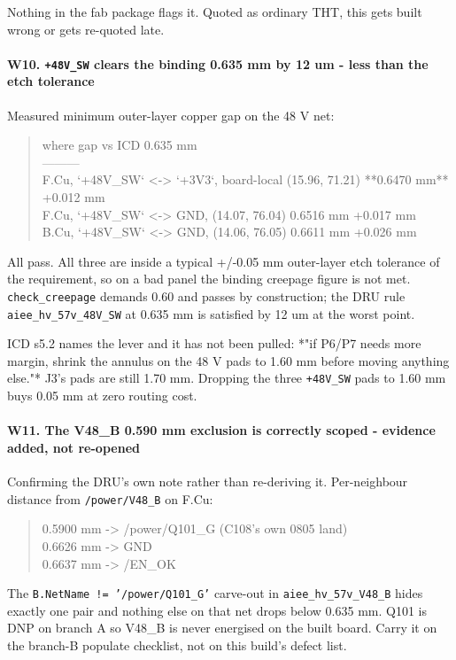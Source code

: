 \documentclass[11pt,a4paper]{article}
\begin{document}
Nothing in the fab package flags it. Quoted as ordinary THT, this gets built wrong or gets re-quoted late.

\paragraph*{W10. \texttt{+48V\_SW} clears the binding 0.635 mm by 12 um - less than the etch tolerance}
Measured minimum outer-layer copper gap on the 48 V net:

\begin{quote}\small\ttfamily\raggedright
\textbar{} where \textbar{} gap \textbar{} vs ICD 0.635 mm \textbar{}\\
\textbar{}---\textbar{}---\textbar{}---\textbar{}\\
\textbar{} F.Cu, `+48V\_SW` \textless{}-\textgreater{} `+3V3`, board-local (15.96, 71.21) \textbar{} {*}{*}0.6470 mm{*}{*} \textbar{} +0.012 mm \textbar{}\\
\textbar{} F.Cu, `+48V\_SW` \textless{}-\textgreater{} GND, (14.07, 76.04) \textbar{} 0.6516 mm \textbar{} +0.017 mm \textbar{}\\
\textbar{} B.Cu, `+48V\_SW` \textless{}-\textgreater{} GND, (14.06, 76.05) \textbar{} 0.6611 mm \textbar{} +0.026 mm \textbar{}
\end{quote}
All pass. All three are inside a typical +/-0.05 mm outer-layer etch tolerance of the requirement, so on a bad panel the binding creepage figure is not met. \texttt{check\_creepage} demands 0.60 and passes by construction; the DRU rule \texttt{aiee\_hv\_57v\_48V\_SW} at 0.635 mm is satisfied by 12 um at the worst point.

ICD s5.2 names the lever and it has not been pulled: {*}"if P6/P7 needs more margin, shrink the annulus on the 48 V pads to 1.60 mm before moving anything else."{*} J3's pads are still 1.70 mm. Dropping the three \texttt{+48V\_SW} pads to 1.60 mm buys 0.05 mm at zero routing cost.

\paragraph*{W11. The V48\_B 0.590 mm exclusion is correctly scoped - evidence added, not re-opened}
Confirming the DRU's own note rather than re-deriving it. Per-neighbour distance from \texttt{/power/V48\_B} on F.Cu:

\begin{quote}\small\ttfamily\raggedright
0.5900 mm -\textgreater{} /power/Q101\_G      (C108's own 0805 land)\\
0.6626 mm -\textgreater{} GND\\
0.6637 mm -\textgreater{} /EN\_OK
\end{quote}
The \texttt{B.NetName != '/power/Q101\_G'} carve-out in \texttt{aiee\_hv\_57v\_V48\_B} hides exactly one pair and nothing else on that net drops below 0.635 mm. Q101 is DNP on branch A so V48\_B is never energised on the built board. Carry it on the branch-B populate checklist, not on this build's defect list.
\end{document}
